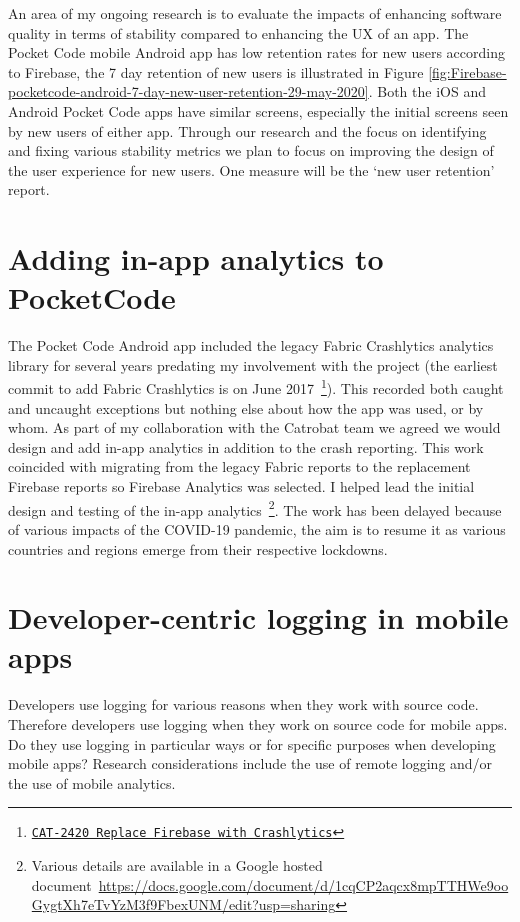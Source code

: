 An area of my ongoing research is to evaluate the impacts of enhancing software quality in terms of stability compared to enhancing the UX of an app. The Pocket Code mobile Android app has low retention rates for new users according to Firebase, the 7 day retention of new users is illustrated in Figure \ref{fig:Firebase-pocketcode-android-7-day-new-user-retention-29-may-2020}. Both the iOS and Android Pocket Code apps have similar screens, especially the initial screens seen by new users of either app. Through our research and the focus on identifying and fixing various stability metrics we plan to focus on improving the design of the user experience for new users. One measure will be the `new user retention' report.

\section{Adding in-app analytics to PocketCode}
The Pocket Code Android app included the legacy Fabric Crashlytics analytics library for several years predating my involvement with the project (the earliest commit to add Fabric Crashlytics is on  June 2017~\footnote{\href{https://github.com/Catrobat/Catroid/commit/95aa37ff5263402b41b63f50296aabc8c354433e}{\texttt{CAT-2420 Replace Firebase with Crashlytics}}}). This recorded both caught and uncaught exceptions but nothing else about how the app was used, or by whom. As part of my collaboration with the Catrobat team we agreed we would design and add in-app analytics in addition to the crash reporting. This work coincided with migrating from the legacy Fabric reports to the replacement Firebase reports so Firebase Analytics was selected. I helped lead the initial design and testing of the in-app analytics~\footnote{Various details are available in a Google hosted document~\url{https://docs.google.com/document/d/1cqCP2aqcx8mpTTHWe9ooGygtXh7eTvYzM3f9FbexUNM/edit?usp=sharing}}. The work has been delayed because of various impacts of the COVID-19 pandemic, the aim is to resume it as various countries and regions emerge from their respective lockdowns.

\section{Developer-centric logging in mobile apps}
Developers use logging for various reasons when they work with source code. Therefore developers use logging when they work on source code for mobile apps. Do they use logging in particular ways or for specific purposes when developing mobile apps? Research considerations include the use of remote logging and/or the use of mobile analytics.

